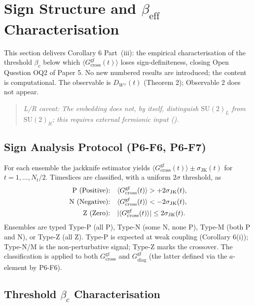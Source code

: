 \documentclass[11pt,a4paper]{article}
\theoremstyle{plain}
\theoremstyle{definition}
\theoremstyle{remark}
\newcommand{\SU}{\mathrm{SU}}
\newcommand{\Gcrossgf}{G_{\mathrm{cross}}^{\mathrm{gf}}}
\newcommand{\Gdiaggf}{G_{\mathrm{diag}}^{\mathrm{gf}}}
\newcommand{\DW}{D_{W^{\pm}}}
\newcommand{\be}{\beta_{\mathrm{eff}}}
\newcommand{\bc}{\beta_{c}}
\newcommand{\Nt}{N_{t}}
\begin{document}
\section{Sign Structure and \texorpdfstring{$\be$}{beta} Characterisation}
\label{sec:signstructure}

This section delivers Corollary 6 Part~(iii): the empirical
characterisation of the threshold $\bc$ below which
$\langle\Gcrossgf(t)\rangle$ loses sign-definiteness, closing Open
Question OQ2 of Paper 5. No new numbered results are introduced; the
content is computational. The observable is $\DW(t)$ (Theorem 2);
Observable 2 does not appear.

\begin{quote}\itshape
L/R caveat: The embedding does not, by itself, distinguish $\SU(2)_L$
from $\SU(2)_R$; this requires external fermionic input ().
\end{quote}

\subsection{Sign Analysis Protocol (P6-F6, P6-F7)}
\label{ssec:signprotocol}

For each ensemble the jackknife estimator yields
$\langle\Gcrossgf(t)\rangle\pm\sigma_{\mathrm{JK}}(t)$ for
$t=1,\ldots,\Nt/2$. Timeslices are classified, with a uniform $2\sigma$
threshold, as
\begin{align}
  \text{P (Positive):}&\quad \langle\Gcrossgf(t)\rangle>+2\sigma_{\mathrm{JK}}(t),\notag\\
  \text{N (Negative):}&\quad \langle\Gcrossgf(t)\rangle<-2\sigma_{\mathrm{JK}}(t),\\
  \text{Z (Zero):}&\quad |\langle\Gcrossgf(t)\rangle|\le 2\sigma_{\mathrm{JK}}(t).\notag
\end{align}
Ensembles are typed Type-P (all P), Type-N (some N, none P), Type-M
(both P and N), or Type-Z (all Z). Type-P is expected at weak coupling
(Corollary 6(i)); Type-N/M is the non-perturbative signal; Type-Z marks
the crossover. The classification is applied to both $\Gcrossgf$ and
$\Gdiaggf$ (the latter defined via the $a$-element by P6-F6).

\subsection{Threshold $\bc$ Characterisation}
\label{ssec:betac}
\end{document}
